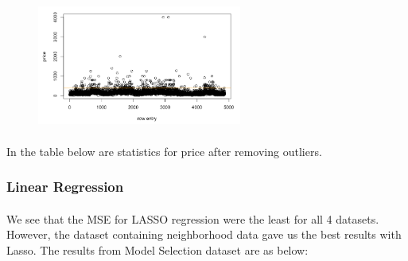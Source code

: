 \documentclass[11pt]{article}
\begin{document}
                \begin{figure}[H]
                	\centering
                	\includegraphics[width=0.6\textwidth]{outliers.png}
                \end{figure}
                
        	\paragraph{}
            	In the table below are statistics for price after removing outliers.
            	\begin{table}[H]
\centering
                \label{my-label4}
                \end{table}
            
        	
            
    
    	\subsubsection{Linear Regression}
        	\paragraph{}
            We see that the MSE for LASSO regression were the least for all 4 datasets. However, the dataset containing neighborhood data gave us the best results with Lasso. The results from Model Selection dataset are as below:
            \begin{table}[H]
\centering

\label{my-label3}
\end{table}
        
\end{document}
